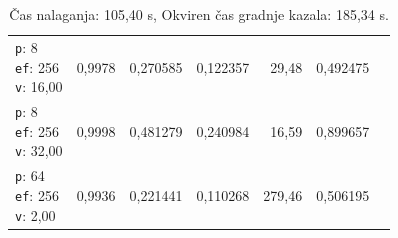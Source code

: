 \begin{table}[htbp]
\begin{tabularx}{\textwidth}{Xrrrrrr}
    \makecell{\texttt{p}: 8\\\texttt{ef}: 256\\\texttt{v}: 16,00} & 0,9978 & 0,270585 & 0,122357 & 29,48 & 0,492475 \\
    \makecell{\texttt{p}: 8\\\texttt{ef}: 256\\\texttt{v}: 32,00} & 0,9998 & 0,481279 & 0,240984 & 16,59 & 0,899657 \\
    \makecell{\texttt{p}: 64\\\texttt{ef}: 256\\\texttt{v}: 2,00} & 0,9936 & 0,221441 & 0,110268 & 279,46 & 0,506195 \\
    \bottomrule
  \end{tabularx}
\caption* {Čas nalaganja: 105,40 s, Okviren čas gradnje kazala: 185,34 s.}\end{table}


